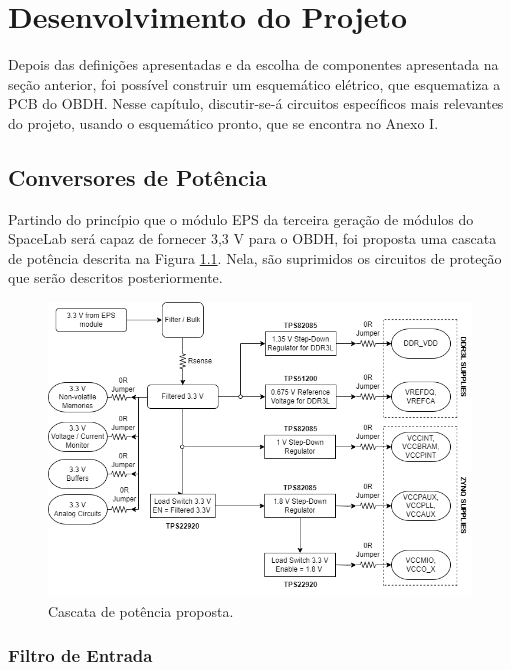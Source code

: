 \chapter{Desenvolvimento do Projeto}

Depois das definições apresentadas e da escolha de componentes apresentada na seção anterior, foi possível construir um esquemático elétrico, que esquematiza a PCB do OBDH. Nesse capítulo, discutir-se-á circuitos específicos mais relevantes do projeto, usando o esquemático pronto, que se encontra no Anexo I.

\section{Conversores de Potência}

Partindo do princípio que o módulo EPS da terceira geração de módulos do SpaceLab será capaz de fornecer 3,3 V para o OBDH, foi proposta uma cascata de potência descrita na Figura \ref{fig:power}. Nela, são suprimidos os circuitos de proteção que serão descritos posteriormente.

\begin{figure}[H]
    \centering
    \includegraphics[scale=0.6]{images/Power_system.png}
    \caption{Cascata de potência proposta.}
    \label{fig:power}
\end{figure}

\subsection{Filtro de Entrada}

